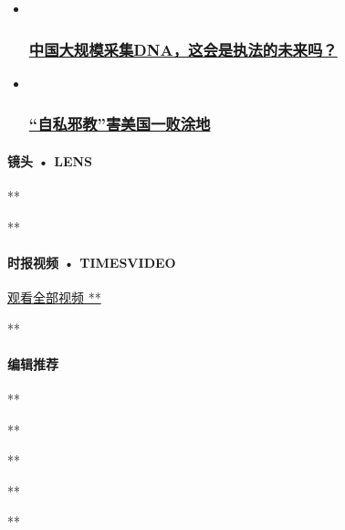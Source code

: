 \begin{itemize}
\item ~
  \hypertarget{ux4e2dux56fdux5927ux89c4ux6a21ux91c7ux96c6dnaux8fd9ux4f1aux662fux6267ux6cd5ux7684ux672aux6765ux5417}{%
  \subsubsection{\texorpdfstring{\href{/opinion/20200728/china-dna-police/}{中国大规模采集DNA，这会是执法的未来吗？}}{中国大规模采集DNA，这会是执法的未来吗？}}\label{ux4e2dux56fdux5927ux89c4ux6a21ux91c7ux96c6dnaux8fd9ux4f1aux662fux6267ux6cd5ux7684ux672aux6765ux5417}}
\item ~
  \hypertarget{ux81eaux79c1ux90aaux6559ux5bb3ux7f8eux56fdux4e00ux8d25ux6d82ux5730}{%
  \subsubsection{\texorpdfstring{\href{/opinion/20200728/us-republicans-coronavirus/}{``自私邪教''害美国一败涂地}}{``自私邪教''害美国一败涂地}}\label{ux81eaux79c1ux90aaux6559ux5bb3ux7f8eux56fdux4e00ux8d25ux6d82ux5730}}
\end{itemize}

\hypertarget{ux955cux5934--lens}{%
\paragraph{镜头 • LENS}\label{ux955cux5934--lens}}

**

**

\hypertarget{ux65f6ux62a5ux89c6ux9891--timesvideo}{%
\paragraph{时报视频 •
TIMESVIDEO}\label{ux65f6ux62a5ux89c6ux9891--timesvideo}}

\href{//www.nytimes.com/video/china}{观看全部视频 **}

**

\hypertarget{ux7f16ux8f91ux63a8ux8350}{%
\paragraph{编辑推荐}\label{ux7f16ux8f91ux63a8ux8350}}

**

**

**

**

**

